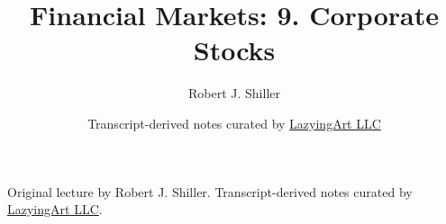\documentclass[11pt,oneside]{book}
\begin{document}
\frontmatter
\title{Financial Markets: 9. Corporate Stocks}
\author{Robert J. Shiller}
\date{Transcript-derived notes curated by \href{https://lazying.art}{LazyingArt LLC}}
\maketitle
\begin{center}
\small Original lecture by Robert J. Shiller. Transcript-derived notes curated by \href{https://lazying.art}{LazyingArt LLC}.
\end{center}
\clearpage
\mainmatter

\end{document}
